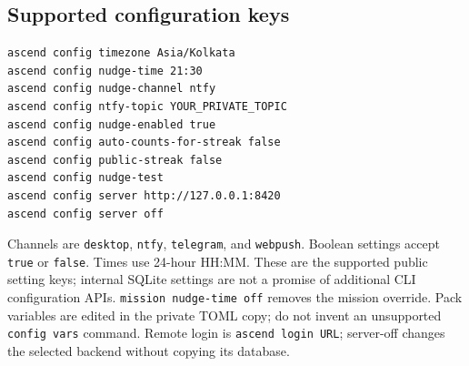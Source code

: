 \subsection{Supported configuration keys}
\begin{verbatim}
ascend config timezone Asia/Kolkata
ascend config nudge-time 21:30
ascend config nudge-channel ntfy
ascend config ntfy-topic YOUR_PRIVATE_TOPIC
ascend config nudge-enabled true
ascend config auto-counts-for-streak false
ascend config public-streak false
ascend config nudge-test
ascend config server http://127.0.0.1:8420
ascend config server off
\end{verbatim}
Channels are \texttt{desktop}, \texttt{ntfy}, \texttt{telegram}, and
\texttt{webpush}. Boolean settings accept \texttt{true} or \texttt{false}.
Times use 24-hour HH:MM. These are the supported public setting keys; internal
SQLite settings are not a promise of additional CLI configuration APIs.
\texttt{mission nudge-time off} removes the mission override. Pack variables are
edited in the private TOML copy; do not invent an unsupported \texttt{config vars}
command. Remote login is \texttt{ascend login URL}; server-off changes the selected
backend without copying its database.

